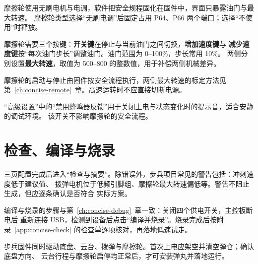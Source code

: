 摩擦轮使用无刷电机与电调，软件把安全规程固化在固件中，界面只暴露油门与最大转速。
摩擦轮类型选择“无刷电调”后固定占用 P64、P66 两个端口；选择“不使用”时释放。

摩擦轮需要三个按键：\textbf{开关键}在停止与当前油门之间切换，\textbf{增加速度键}与
\textbf{减少速度键}按“每次油门步长”调整油门。油门范围为 0--100\%，步长常用 10\%。
两侧分别设置\textbf{最大转速}，取值为 500--800 的整数值，用于补偿两侧机械差异。

摩擦轮的启动与停止由固件按安全流程执行，两侧最大转速的标定方法见
第~\ref{ch:concise-remote}~章。高速运转时不应直接切断电源。

“高级设置”中的“禁用蜂鸣器反馈”用于关闭上电与状态变化时的提示音，适合安静的调试环境。
该开关不影响摩擦轮的安全流程。

\section{检查、编译与烧录}

三页配置完成后进入“检查与摘要”。除错误外，步兵项目常见的警告包括：冲刺速度低于建议值、
拨弹电机位于低频引脚组、摩擦轮最大转速偏低等。警告不阻止生成，但应逐条确认是否符合
实际方案。

编译与烧录的步骤与第~\ref{ch:concise-debug}~章一致：关闭四个供电开关，主控板断电后
重新连接 USB，检测到设备后点击“编译并烧录”。烧录完成后按附录~\ref{app:concise-check}
的检查单逐项核对，再落地低速试走。

\begin{note}
步兵固件同时驱动底盘、云台、拨弹与摩擦轮。首次上电应架空并清空弹仓；确认底盘方向、
云台行程与摩擦轮启停均正常后，才可安装弹丸并落地运行。
\end{note}
